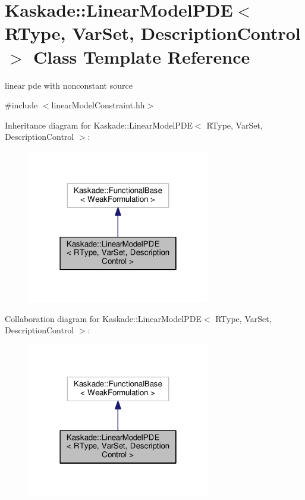 \hypertarget{classKaskade_1_1LinearModelPDE}{\section{Kaskade\-:\-:Linear\-Model\-P\-D\-E$<$ R\-Type, Var\-Set, Description\-Control $>$ Class Template Reference}
\label{classKaskade_1_1LinearModelPDE}
}


linear pde with nonconstant source  




{\ttfamily \#include $<$linear\-Model\-Constraint.\-hh$>$}



Inheritance diagram for Kaskade\-:\-:Linear\-Model\-P\-D\-E$<$ R\-Type, Var\-Set, Description\-Control $>$\-:
\nopagebreak
\begin{figure}[H]
\begin{center}
\leavevmode
\includegraphics[width=226pt]{classKaskade_1_1LinearModelPDE__inherit__graph}
\end{center}
\end{figure}


Collaboration diagram for Kaskade\-:\-:Linear\-Model\-P\-D\-E$<$ R\-Type, Var\-Set, Description\-Control $>$\-:
\nopagebreak
\begin{figure}[H]
\begin{center}
\leavevmode
\includegraphics[width=226pt]{classKaskade_1_1LinearModelPDE__coll__graph}
\end{center}
\end{figure}
